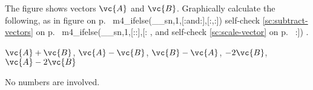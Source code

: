  The figure shows vectors $\vc{A}$ and $\vc{B}$. 
Graphically calculate the following, as in 
figure  on p.~\pageref{fig:tip-to-tail}
m4_ifelse(__sn,1,[:and:],[:,:])
self-check
\ref{sc:subtract-vectors} on p.~\pageref{sc:subtract-vectors}%
m4_ifelse(__sn,1,[::],[:%
, and self-check \ref{sc:scale-vector} on p.~\pageref{sc:scale-vector}%
:])%
.

         $\vc{A}+\vc{B}$,  $\vc{A}-\vc{B}$,  $\vc{B}-\vc{A}$,  $-2\vc{B}$,  $\vc{A}-2\vc{B}$

\noindent No numbers are involved.
